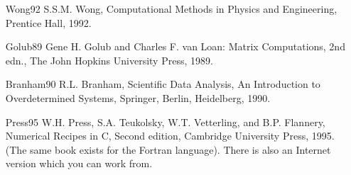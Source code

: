 \documentclass[12pt]{article}
\begin{document}
\begin{itemize} 
\item[Wong92] S.S.M. Wong, Computational Methods in Physics and Engineering, Prentice Hall, 1992.
\item[Golub89] Gene H. Golub and Charles F. van Loan: Matrix Computations, 2nd edn., The John Hopkins University Press, 1989.
\item[Branham90] R.L. Branham, Scientific Data Analysis, An Introduction to Overdetermined Systems, Springer, Berlin, Heidelberg, 1990.
\item[Press95] W.H. Press, S.A. Teukolsky, W.T. Vetterling, and B.P. Flannery, Numerical Recipes in C, Second edition, Cambridge University Press, 1995. (The same book exists for the Fortran language). There is also an Internet version which you can work from.
\end{itemize}
\end{document}

